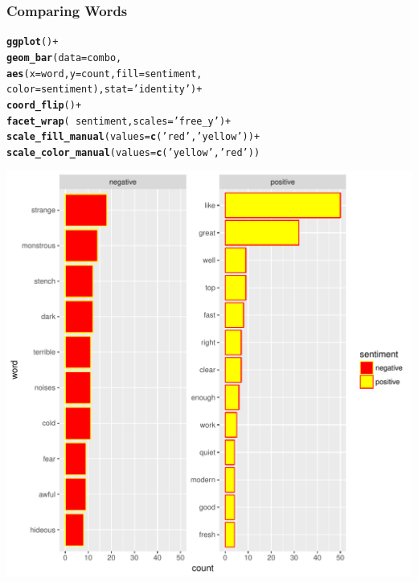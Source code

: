 \documentclass{beamer}\usepackage[]{graphicx}\usepackage[]{color}
\makeatletter
\def\maxwidth{ %
  \ifdim\Gin@nat@width>\linewidth
    \linewidth
  \else
    \Gin@nat@width
  \fi
}
\newcommand{\hlstr}[1]{\textcolor[rgb]{0.192,0.494,0.8}{#1}}%
\newcommand{\hlopt}[1]{\textcolor[rgb]{0,0,0}{#1}}%
\newcommand{\hlstd}[1]{\textcolor[rgb]{0.345,0.345,0.345}{#1}}%
\newcommand{\hlkwc}[1]{\textcolor[rgb]{0.333,0.667,0.333}{#1}}%
\newcommand{\hlkwd}[1]{\textcolor[rgb]{0.737,0.353,0.396}{\textbf{#1}}}%
\newenvironment{kframe}{%
 \def\at@end@of@kframe{}%
 \ifinner\ifhmode%
  \def\at@end@of@kframe{\end{minipage}}%
  \begin{minipage}{\columnwidth}%
 \fi\fi%
 \def\FrameCommand##1{\hskip\@totalleftmargin \hskip-\fboxsep
 \colorbox{shadecolor}{##1}\hskip-\fboxsep
     \hskip-\linewidth \hskip-\@totalleftmargin \hskip\columnwidth}%
 \MakeFramed {\advance\hsize-\width
   \@totalleftmargin\z@ \linewidth\hsize
   \@setminipage}}%
 {\par\unskip\endMakeFramed%
 \at@end@of@kframe}
\newenvironment{knitrout}{}{} %
\makeatother
\begin{document}
\begin{frame}
\frametitle{Comparing Words}
\begin{knitrout}
\color{fgcolor}\begin{kframe}
\begin{alltt}
\hlkwd{ggplot}\hlstd{()}\hlopt{+}
  \hlkwd{geom_bar}\hlstd{(}\hlkwc{data}\hlstd{=combo,}
           \hlkwd{aes}\hlstd{(}\hlkwc{x}\hlstd{=word,}\hlkwc{y}\hlstd{=count,} \hlkwc{fill}\hlstd{=sentiment,}
               \hlkwc{color}\hlstd{=sentiment),}\hlkwc{stat}\hlstd{=}\hlstr{'identity'}\hlstd{)}\hlopt{+}
  \hlkwd{coord_flip}\hlstd{()}\hlopt{+}
  \hlkwd{facet_wrap}\hlstd{(}\hlopt{~}\hlstd{sentiment,}\hlkwc{scales}\hlstd{=}\hlstr{'free_y'}\hlstd{)}\hlopt{+}
  \hlkwd{scale_fill_manual}\hlstd{(}\hlkwc{values}\hlstd{=}\hlkwd{c}\hlstd{(}\hlstr{'red'}\hlstd{,}\hlstr{'yellow'}\hlstd{))}\hlopt{+}
\hlkwd{scale_color_manual}\hlstd{(}\hlkwc{values}\hlstd{=}\hlkwd{c}\hlstd{(}\hlstr{'yellow'}\hlstd{,}\hlstr{'red'}\hlstd{))}
\end{alltt}
\end{kframe}
\includegraphics[width=\maxwidth]{figure/unnamed-chunk-13-1} 

\end{knitrout}
\framebreak
\end{frame}
\end{document}
